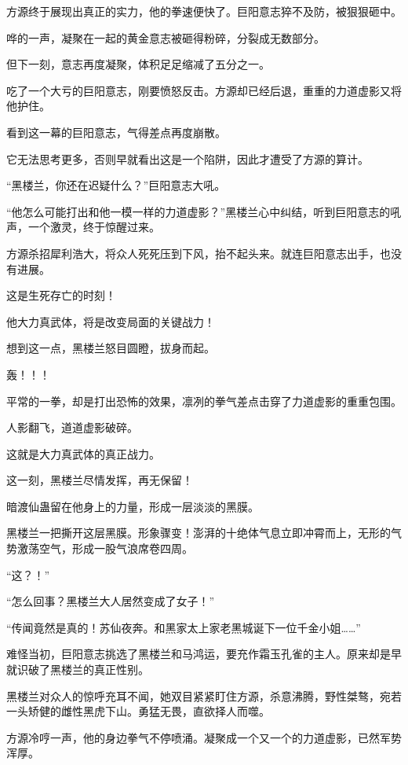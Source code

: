 
\begin{this_body}

方源终于展现出真正的实力，他的拳速便快了。巨阳意志猝不及防，被狠狠砸中。

哗的一声，凝聚在一起的黄金意志被砸得粉碎，分裂成无数部分。

但下一刻，意志再度凝聚，体积足足缩减了五分之一。

吃了一个大亏的巨阳意志，刚要愤怒反击。方源却已经后退，重重的力道虚影又将他护住。

看到这一幕的巨阳意志，气得差点再度崩散。

它无法思考更多，否则早就看出这是一个陷阱，因此才遭受了方源的算计。

“黑楼兰，你还在迟疑什么？”巨阳意志大吼。

“他怎么可能打出和他一模一样的力道虚影？”黑楼兰心中纠结，听到巨阳意志的吼声，一个激灵，终于惊醒过来。

方源杀招犀利浩大，将众人死死压到下风，抬不起头来。就连巨阳意志出手，也没有进展。

这是生死存亡的时刻！

他大力真武体，将是改变局面的关键战力！

想到这一点，黑楼兰怒目圆瞪，拔身而起。

轰！！！

平常的一拳，却是打出恐怖的效果，凛冽的拳气差点击穿了力道虚影的重重包围。

人影翻飞，道道虚影破碎。

这就是大力真武体的真正战力。

这一刻，黑楼兰尽情发挥，再无保留！

暗渡仙蛊留在他身上的力量，形成一层淡淡的黑膜。

黑楼兰一把撕开这层黑膜。形象骤变！澎湃的十绝体气息立即冲霄而上，无形的气势激荡空气，形成一股气浪席卷四周。

“这？！”

“怎么回事？黑楼兰大人居然变成了女子！”

“传闻竟然是真的！苏仙夜奔。和黑家太上家老黑城诞下一位千金小姐……”

难怪当初，巨阳意志挑选了黑楼兰和马鸿运，要充作霜玉孔雀的主人。原来却是早就识破了黑楼兰的真正性别。

黑楼兰对众人的惊呼充耳不闻，她双目紧紧盯住方源，杀意沸腾，野性桀骜，宛若一头矫健的雌性黑虎下山。勇猛无畏，直欲择人而噬。

方源冷哼一声，他的身边拳气不停喷涌。凝聚成一个又一个的力道虚影，已然军势浑厚。


\end{this_body}

